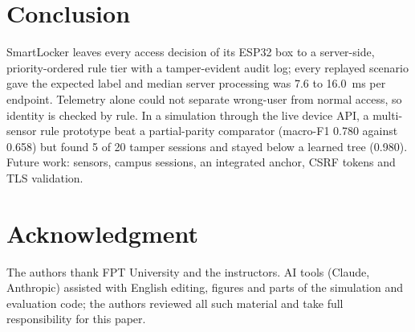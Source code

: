 \documentclass[journal,onecolumn]{IEEEtran}
\begin{document}
\section{Conclusion}

SmartLocker leaves every access decision of its ESP32 box to a server-side, priority-ordered rule tier with a
tamper-evident audit log; every replayed scenario gave the expected label and median server processing was 7.6 to
16.0~ms per endpoint. Telemetry alone could not separate wrong-user from normal access, so identity is checked by rule.
In a simulation through the live device API, a multi-sensor rule prototype beat a partial-parity comparator (macro-F1
0.780 against 0.658) but found 5 of 20 tamper sessions and stayed below a learned tree (0.980). Future work: sensors,
campus sessions, an integrated anchor, CSRF tokens and TLS validation.

\section*{Acknowledgment}

The authors thank FPT University and the instructors. AI tools (Claude, Anthropic) assisted with English editing,
figures and parts of the simulation and evaluation code; the authors reviewed all such material and take full
responsibility for this paper.
\end{document}
